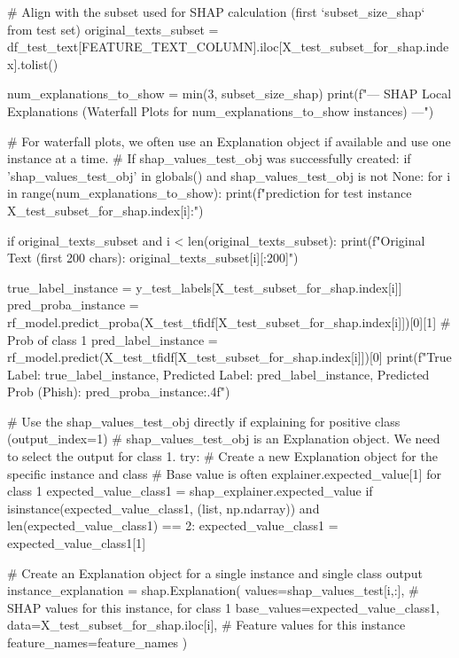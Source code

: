 \begin{ffcode}
        # Align with the subset used for SHAP calculation (first `subset_size_shap` from test set)
        original_texts_subset = df_test_text[FEATURE_TEXT_COLUMN].iloc[X_test_subset_for_shap.index].tolist()

    num_explanations_to_show = min(3, subset_size_shap)
    print(f"\n--- SHAP Local Explanations (Waterfall Plots for {num_explanations_to_show} instances) ---")

    # For waterfall plots, we often use an Explanation object if available and use one instance at a time.
    # If shap_values_test_obj was successfully created:
    if 'shap_values_test_obj' in globals() and shap_values_test_obj is not None:
        for i in range(num_explanations_to_show):
            print(f"\nExplaining prediction for test instance {X_test_subset_for_shap.index[i]}:")

            if original_texts_subset and i < len(original_texts_subset):
                print(f"Original Text (first 200 chars): {original_texts_subset[i][:200]}")

            true_label_instance = y_test_labels[X_test_subset_for_shap.index[i]]
            pred_proba_instance = rf_model.predict_proba(X_test_tfidf[X_test_subset_for_shap.index[i]])[0][1] # Prob of class 1
            pred_label_instance = rf_model.predict(X_test_tfidf[X_test_subset_for_shap.index[i]])[0]
            print(f"True Label: {true_label_instance}, Predicted Label: {pred_label_instance}, Predicted Prob (Phish): {pred_proba_instance:.4f}")

            # Use the shap_values_test_obj directly if explaining for positive class (output_index=1)
            # shap_values_test_obj is an Explanation object. We need to select the output for class 1.
            try:
                # Create a new Explanation object for the specific instance and class
                # Base value is often explainer.expected_value[1] for class 1
                expected_value_class1 = shap_explainer.expected_value
                if isinstance(expected_value_class1, (list, np.ndarray)) and len(expected_value_class1) == 2:
                    expected_value_class1 = expected_value_class1[1]

                # Create an Explanation object for a single instance and single class output
                instance_explanation = shap.Explanation(
                    values=shap_values_test[i,:], # SHAP values for this instance, for class 1
                    base_values=expected_value_class1,
                    data=X_test_subset_for_shap.iloc[i], # Feature values for this instance
                    feature_names=feature_names
                )


\end{ffcode}
